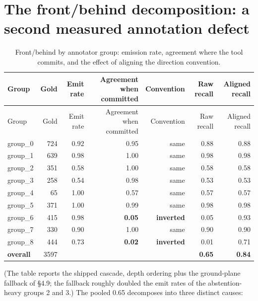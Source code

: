 \section{The front/behind decomposition: a second measured annotation defect}

\begin{center}
\small
\begin{longtable}{lrrrrrr}
\caption{Front/behind by annotator group: emission rate, agreement where the tool commits, and the effect of aligning the direction convention.}\\
\hline
Group & Gold & Emit rate & Agreement when committed & Convention & Raw recall & Aligned recall \\
\hline
\endfirsthead
\hline
Group & Gold & Emit rate & Agreement when committed & Convention & Raw recall & Aligned recall \\
\hline
\endhead
group\_0 & 724 & 0.92 & 0.95 & same & 0.88 & 0.88 \\
group\_1 & 639 & 0.98 & 1.00 & same & 0.98 & 0.98 \\
group\_2 & 351 & 0.58 & 1.00 & same & 0.58 & 0.58 \\
group\_3 & 258 & 0.54 & 0.98 & same & 0.53 & 0.53 \\
group\_4 & 65 & 1.00 & 0.57 & same & 0.57 & 0.57 \\
group\_5 & 371 & 1.00 & 0.99 & same & 0.98 & 0.98 \\
group\_6 & 415 & 0.98 & \textbf{0.05} & \textbf{inverted} & 0.05 & 0.93 \\
group\_7 & 330 & 0.90 & 1.00 & same & 0.90 & 0.90 \\
group\_8 & 444 & 0.73 & \textbf{0.02} & \textbf{inverted} & 0.01 & 0.71 \\
\textbf{overall} & 3597 &  &  &  & \textbf{0.65} & \textbf{0.84} \\
\hline
\end{longtable}
\end{center}

(The table reports the shipped cascade, depth ordering plus the ground-plane fallback of \S4.9; the fallback roughly doubled the emit rates of the abstention-heavy groups 2 and 3.) The pooled 0.65 decomposes into three distinct causes:

